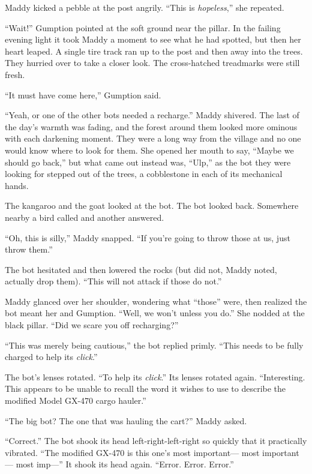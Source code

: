 \documentclass[10pt]{article}
\begin{document}
Maddy kicked a pebble at the post angrily. ``This is \emph{hopeless},''
she repeated.

``Wait!'' Gumption pointed at the soft ground near the pillar. In the
failing evening light it took Maddy a moment to see what he had spotted,
but then her heart leaped. A single tire track ran up to the post and
then away into the trees. They hurried over to take a closer look. The
cross-hatched treadmarks were still fresh.

``It must have come here,'' Gumption said.

``Yeah, or one of the other bots needed a recharge.'' Maddy shivered.
The last of the day's warmth was fading, and the forest around them
looked more ominous with each darkening moment. They were a long way
from the village and no one would know where to look for them. She
opened her mouth to say, ``Maybe we should go back,'' but what came out
instead was, ``Ulp,'' as the bot they were looking for stepped out of
the trees, a cobblestone in each of its mechanical hands.

The kangaroo and the goat looked at the bot. The bot looked back.
Somewhere nearby a bird called and another answered.

``Oh, this is silly,'' Maddy snapped. ``If you're going to throw those
at us, just throw them.''

The bot hesitated and then lowered the rocks (but did not, Maddy noted,
actually drop them). ``This will not attack if those do not.''

Maddy glanced over her shoulder, wondering what ``those'' were, then
realized the bot meant her and Gumption. ``Well, we won't unless you
do.'' She nodded at the black pillar. ``Did we scare you off
recharging?''

``This was merely being cautious,'' the bot replied primly. ``This needs
to be fully charged to help its \emph{click}.''

The bot's lenses rotated. ``To help its \emph{click}.'' Its lenses
rotated again. ``Interesting. This appears to be unable to recall the
word it wishes to use to describe the modified Model GX-470 cargo
hauler.''

``The big bot? The one that was hauling the cart?'' Maddy asked.

``Correct.'' The bot shook its head left-right-left-right so quickly
that it practically vibrated. ``The modified GX-470 is this one's most
important--- most important--- most imp---'' It shook its head again.
``Error. Error. Error.''
\end{document}
